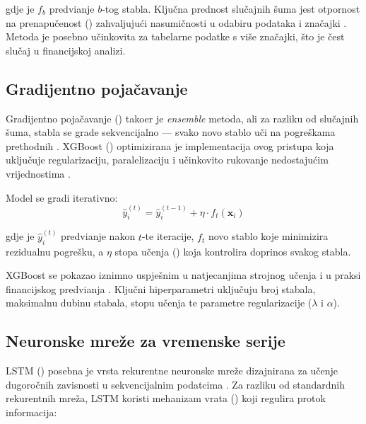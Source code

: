 \documentclass[zavrsnirad]{fer}
\begin{document}
gdje je $f_b$ predvi\dj anje $b$-tog stabla. Klju\v{c}na prednost slu\v{c}ajnih \v{s}uma jest otpornost na prenapu\v{c}enost () zahvaljuju\'{c}i nasumi\v{c}nosti u odabiru podataka i zna\v{c}ajki \citep{breiman2001random}. Metoda je posebno u\v{c}inkovita za tabelarne podatke s vi\v{s}e zna\v{c}ajki, \v{s}to je \v{c}est slu\v{c}aj u financijskoj analizi.

\subsection{Gradijentno poja\v{c}avanje}
\label{subsec:gradient_boosting}

Gradijentno poja\v{c}avanje () tako\dj er je \textit{ensemble} metoda, ali za razliku od slu\v{c}ajnih \v{s}uma, stabla se grade sekvencijalno --- svako novo stablo u\v{c}i na pogre\v{s}kama prethodnih \citep{hastie2009elements}. XGBoost () optimizirana je implementacija ovog pristupa koja uklju\v{c}uje regularizaciju, paralelizaciju i u\v{c}inkovito rukovanje nedostaju\'{c}im vrijednostima \citep{chen2016xgboost}.

Model se gradi iterativno:
\begin{equation}
    \hat{y}_i^{(t)} = \hat{y}_i^{(t-1)} + \eta \cdot f_t(\mathbf{x}_i)
    \label{eq:xgboost}
\end{equation}

gdje je $\hat{y}_i^{(t)}$ predvi\dj anje nakon $t$-te iteracije, $f_t$ novo stablo koje minimizira rezidualnu pogre\v{s}ku, a $\eta$ stopa u\v{c}enja () koja kontrolira doprinos svakog stabla.

XGBoost se pokazao iznimno uspje\v{s}nim u natjecanjima strojnog u\v{c}enja i u praksi financijskog predvi\dj anja \citep{chen2016xgboost}. Klju\v{c}ni hiperparametri uklju\v{c}uju broj stabala, maksimalnu dubinu stabala, stopu u\v{c}enja te parametre regularizacije ($\lambda$ i $\alpha$).

\subsection{Neuronske mre\v{z}e za vremenske serije}
\label{subsec:neuronske_mreze}

LSTM () posebna je vrsta rekurentne neuronske mre\v{z}e dizajnirana za u\v{c}enje dugoro\v{c}nih zavisnosti u sekvencijalnim podatcima \citep{hochreiter1997lstm}. Za razliku od standardnih rekurentnih mre\v{z}a, LSTM koristi mehanizam vrata () koji regulira protok informacija:
\end{document}
